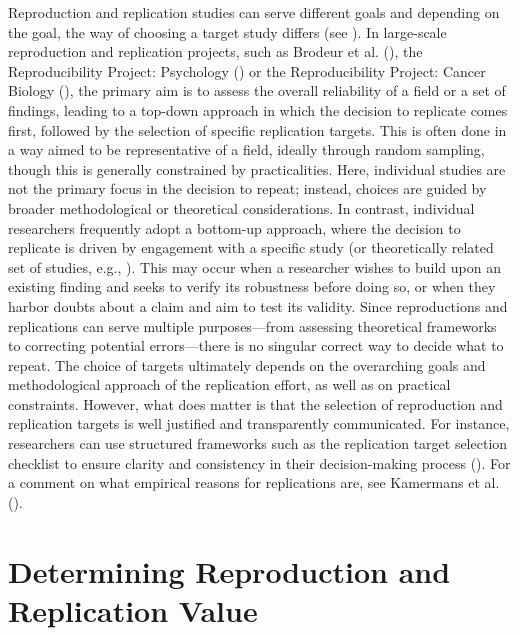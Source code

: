 \documentclass[
  letterpaper,
  DIV=11,
  openany,
  fontsize=12pt,
  parskip=half,
  headings=big,
  numbers=noenddot,
  titlepage=false]{scrreprt}
\begin{document}
Reproduction and replication studies can serve different goals and
depending on the goal, the way of choosing a target study differs (see
). In large-scale
reproduction and replication projects, such as Brodeur et al.
(), the Reproducibility Project:
Psychology () or the Reproducibility Project: Cancer Biology
(), the
primary aim is to assess the overall reliability of a field or a set of
findings, leading to a top-down approach in which the decision to
replicate comes first, followed by the selection of specific replication
targets. This is often done in a way aimed to be representative of a
field, ideally through random sampling, though this is generally
constrained by practicalities. Here, individual studies are not the
primary focus in the decision to repeat; instead, choices are guided by
broader methodological or theoretical considerations. In contrast,
individual researchers frequently adopt a bottom-up approach, where the
decision to replicate is driven by engagement with a specific study (or
theoretically related set of studies, e.g.,
). This may occur
when a researcher wishes to build upon an existing finding and seeks to
verify its robustness before doing so, or when they harbor doubts about
a claim and aim to test its validity. Since reproductions and
replications can serve multiple purposes---from assessing theoretical
frameworks to correcting potential errors---there is no singular correct
way to decide what to repeat. The choice of targets ultimately depends
on the overarching goals and methodological approach of the replication
effort, as well as on practical constraints. However, what does matter
is that the selection of reproduction and replication targets is well
justified and transparently communicated. For instance, researchers can
use structured frameworks such as the replication target selection
checklist to ensure clarity and consistency in their decision-making
process (). For a
comment on what empirical reasons for replications are, see Kamermans et
al. ().

\section{Determining Reproduction and Replication
Value}\label{determining-reproduction-and-replication-value}
\end{document}
